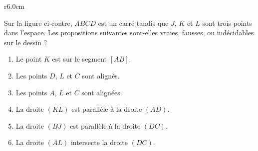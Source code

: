 
\begin{exercice}\label{exoSeconde-0091}

\begin{wrapfigure}{r}{6.0cm}
            \vspace{-0.5cm}        %
                \centering
                    
                \end{wrapfigure}


    Sur la figure ci-contre, \( ABCD\) est un carré tandis que \( J\), \( K\) et \( L\) sont trois points dans l'espace. Les propositions suivantes sont-elles vraies, fausses, ou indécidables sur le dessin ?

    \begin{enumerate}
        \item
            Le point \( K\) est sur le segment \( [AB]\).
        \item
            Les points \( D\), \( L\) et \( C\) sont alignés.
        \item
            Les points \( A\), \( L\) et \( C\) sont alignées.
        \item
            La droite \( (KL)\) est parallèle à la droite \( (AD)\).
        \item
            La droite \( (BJ)\) est parallèle à la droite \( (DC)\).
        \item
            La droite \( (AL)\) intersecte la droite \( (DC)\).
    \end{enumerate}

\end{exercice}
